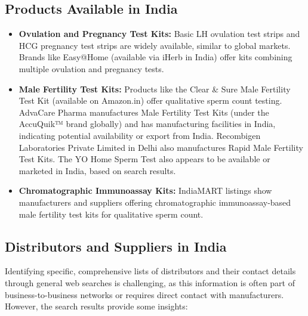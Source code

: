 \documentclass{article}
\begin{document}
\subsection{Products Available in India}
\begin{itemize}
    \item \textbf{Ovulation and Pregnancy Test Kits:} Basic LH ovulation test strips and HCG pregnancy test strips are widely available, similar to global markets. Brands like Easy@Home (available via iHerb in India) offer kits combining multiple ovulation and pregnancy tests.
    \item \textbf{Male Fertility Test Kits:} Products like the Clear & Sure Male Fertility Test Kit (available on Amazon.in) offer qualitative sperm count testing. AdvaCare Pharma manufactures Male Fertility Test Kits (under the AccuQuik™ brand globally) and has manufacturing facilities in India, indicating potential availability or export from India. Recombigen Laboratories Private Limited in Delhi also manufactures Rapid Male Fertility Test Kits. The YO Home Sperm Test also appears to be available or marketed in India, based on search results.
    \item \textbf{Chromatographic Immunoassay Kits:} IndiaMART listings show manufacturers and suppliers offering chromatographic immunoassay-based male fertility test kits for qualitative sperm count.
\end{itemize}

\subsection{Distributors and Suppliers in India}
Identifying specific, comprehensive lists of distributors and their contact details through general web searches is challenging, as this information is often part of business-to-business networks or requires direct contact with manufacturers. However, the search results provide some insights:
\end{document}
